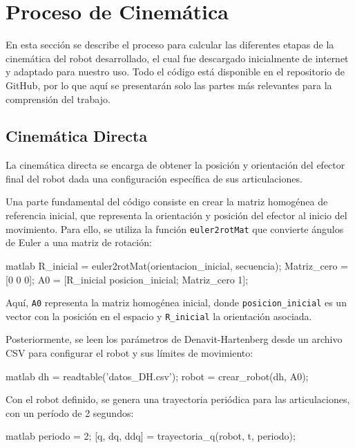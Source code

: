 \section{Proceso de Cinemática} \label{sec:proceso_cinematica}

En esta sección se describe el proceso para calcular las diferentes etapas de la cinemática del robot desarrollado, el cual fue descargado inicialmente de internet y adaptado para nuestro uso. Todo el código está disponible en el repositorio de GitHub, por lo que aquí se presentarán solo las partes más relevantes para la comprensión del trabajo.

\subsection{Cinemática Directa}

La cinemática directa se encarga de obtener la posición y orientación del efector final del robot dada una configuración específica de sus articulaciones.

Una parte fundamental del código consiste en crear la matriz homogénea de referencia inicial, que representa la orientación y posición del efector al inicio del movimiento. Para ello, se utiliza la función \texttt{euler2rotMat} que convierte ángulos de Euler a una matriz de rotación:

\begin{matlabcode}{matlab}
	R_inicial = euler2rotMat(orientacion_inicial, secuencia);
	Matriz_cero = [0 0 0];
	A0 = [R_inicial posicion_inicial;
	Matriz_cero 1];
\end{matlabcode}

Aquí, \texttt{A0} representa la matriz homogénea inicial, donde \texttt{posicion_inicial} es un vector con la posición en el espacio y \texttt{R_inicial} la orientación asociada.

Posteriormente, se leen los parámetros de Denavit-Hartenberg desde un archivo CSV para configurar el robot y sus límites de movimiento:

\begin{matlabcode}{matlab}
	dh = readtable('datos\tabla_DH\robotFinal.csv');
	robot = crear_robot(dh, A0);
\end{matlabcode}

Con el robot definido, se genera una trayectoria periódica para las articulaciones, con un período de 2 segundos:

\begin{matlabcode}{matlab}
	periodo = 2;    %
	[q, dq, ddq] = trayectoria_q(robot, t, periodo);
\end{matlabcode}

